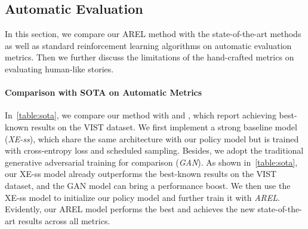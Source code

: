 \documentclass[11pt,a4paper]{article}
\begin{document}
\subsection{Automatic Evaluation}
In this section, we compare our AREL method with the state-of-the-art methods as well as standard reinforcement learning algorithms on automatic evaluation metrics. Then we further discuss the limitations of the hand-crafted metrics on evaluating human-like stories.

\paragraph{Comparison with SOTA on Automatic Metrics}
In~\autoref{table:sota}, we compare our method with \citet{huang2016visual} and \citet{yu-bansal-berg:2017:EMNLP2017}, which report achieving best-known results on the VIST dataset. We first implement a strong baseline model (\textit{XE-ss}), which share the same architecture with our policy model but is trained with cross-entropy loss and scheduled sampling. Besides, we adopt the traditional generative adversarial training for comparison (\textit{GAN}). As shown in~\autoref{table:sota}, our XE-ss model already outperforms the best-known results on the VIST dataset, and the GAN model can bring a performance boost. We then use the XE-ss model to initialize our policy model and further train it with \textit{AREL}. Evidently, our AREL model performs the best and achieves the new state-of-the-art results across all metrics. 
\end{document}
